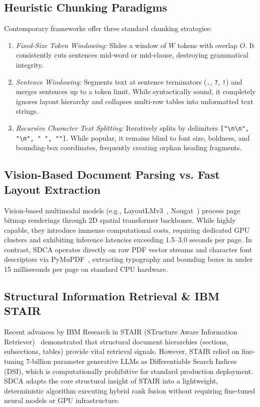 \documentclass[conference]{IEEEtran}
\begin{document}
\subsection{Heuristic Chunking Paradigms}
Contemporary frameworks offer three standard chunking strategies:
\begin{enumerate}
    \item \textit{Fixed-Size Token Windowing:} Slides a window of $W$ tokens with overlap $O$. It consistently cuts sentences mid-word or mid-clause, destroying grammatical integrity.
    \item \textit{Sentence Windowing:} Segments text at sentence terminators (\texttt{.}, \texttt{?}, \texttt{!}) and merges sentences up to a token limit. While syntactically sound, it completely ignores layout hierarchy and collapses multi-row tables into unformatted text strings.
    \item \textit{Recursive Character Text Splitting:} Iteratively splits by delimiters \texttt{["\textbackslash n\textbackslash n", "\textbackslash n", " ", ""]}. While popular, it remains blind to font size, boldness, and bounding-box coordinates, frequently creating orphan heading fragments.
\end{enumerate}

\subsection{Vision-Based Document Parsing vs. Fast Layout Extraction}
Vision-based multimodal models (e.g., LayoutLMv3~\cite{xu2022layoutlmv3}, Nougat~\cite{blecher2023nougat}) process page bitmap renderings through 2D spatial transformer backbones. While highly capable, they introduce immense computational costs, requiring dedicated GPU clusters and exhibiting inference latencies exceeding 1.5--3.0 seconds per page. In contrast, SDCA operates directly on raw PDF vector streams and character font descriptors via PyMuPDF~\cite{pymupdf2024}, extracting typography and bounding boxes in under 15 milliseconds per page on standard CPU hardware.

\subsection{Structural Information Retrieval \& IBM STAIR}
Recent advances by IBM Research in STAIR (STructure Aware Information Retriever)~\cite{ibm2024stair} demonstrated that structural document hierarchies (sections, subsections, tables) provide vital retrieval signals. However, STAIR relied on fine-tuning 7-billion parameter generative LLMs as Differentiable Search Indices (DSI), which is computationally prohibitive for standard production deployment. SDCA adapts the core structural insight of STAIR into a lightweight, deterministic algorithm executing hybrid rank fusion without requiring fine-tuned neural models or GPU infrastructure.
\end{document}
